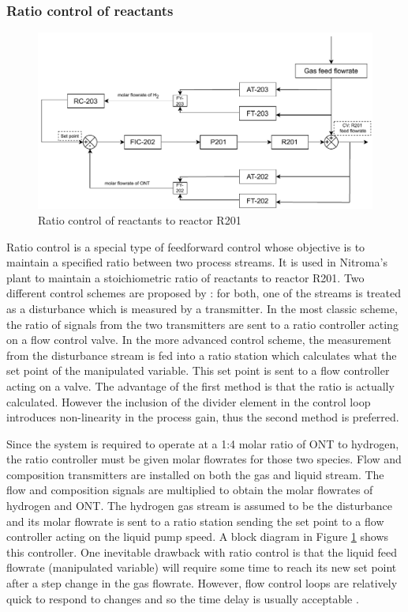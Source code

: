 \subsubsection{Ratio control of reactants} %
    \begin{figure}[h]
    \centering
    \includegraphics[width=\linewidth]{chapters/4-operation-control/4-Figures/R201-FC.pdf}
    \caption{Ratio control of reactants to reactor R201}
    \label{fig:R201-FC}
    \end{figure} 
Ratio control is a special type of feedforward control whose objective is to maintain a specified ratio between two process streams. It is used in Nitroma's plant to maintain a stoichiometric ratio of reactants to reactor R201. Two different control schemes are proposed by \textcite{seborg_process_2011}: for both, one of the streams is treated as a disturbance which is measured by a transmitter. In the most classic scheme, the ratio of signals from the two transmitters are sent to a ratio controller acting on a flow control valve. In the more advanced control scheme, the measurement from the disturbance stream is fed into a ratio station which calculates what the set point of the manipulated variable. This set point is sent to a flow controller acting on a valve. The advantage of the first method is that the ratio is actually calculated. However the inclusion of the divider element in the control loop introduces non-linearity in the process gain, thus the second method is preferred. 

Since the system is required to operate at a 1:4 molar ratio of ONT to hydrogen, the ratio controller must be given molar flowrates for those two species. Flow and composition transmitters are installed on both the gas and liquid stream. The flow and composition signals are multiplied to obtain the molar flowrates of hydrogen and ONT. The hydrogen gas stream is assumed to be the disturbance and its molar flowrate is sent to a ratio station sending the set point to a flow controller acting on the liquid pump speed. A block diagram in Figure \ref{fig:R201-FC} shows this controller. One inevitable drawback with ratio control is that the liquid feed flowrate (manipulated variable) will require some time to reach its new set point after a step change in the gas flowrate. However, flow control loops are relatively quick to respond to changes and so the time delay is usually acceptable \cite{seborg_process_2011}.

